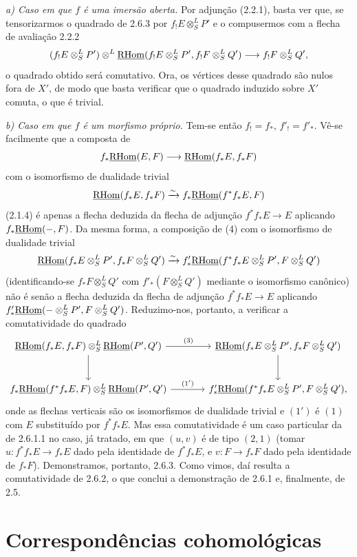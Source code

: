 \emph{a) Caso em que $f$ é uma imersão aberta.} Por adjunção (2.2.1), basta ver que, se tensorizarmos o quadrado de 2.6.3 por $f_!E\otimes^L_SP'$ e o compusermos com a flecha de avaliação 2.2.2
\[
(f_!E\otimes^L_SP')\otimes^L\underline{\mathrm{RHom}}(f_!E\otimes^L_SP',f_!F\otimes^L_SQ')\longrightarrow f_!F\otimes^L_SQ',
\]
o quadrado obtido será comutativo. Ora, os vértices desse quadrado são nulos fora de $X'$, de modo que basta verificar que o quadrado induzido sobre $X'$ comuta, o que é trivial.

\emph{b) Caso em que $f$ é um morfismo próprio.} Tem-se então $f_!=f_*$, $f'_!=f'_*$. Vê-se facilmente que a composta de
\[
f_*\underline{\mathrm{RHom}}(E,F)\longrightarrow\underline{\mathrm{RHom}}(f_*E,f_*F)
\]
com o isomorfismo de dualidade trivial
\[
\underline{\mathrm{RHom}}(f_*E,f_*F)\xrightarrow{\sim}f_*\underline{\mathrm{RHom}}(f^{*}f_*E,F)
\]
(2.1.4) é apenas a flecha deduzida da flecha de adjunção $f^{*}f_*E\to E$ aplicando $f_*\underline{\mathrm{RHom}}(-,F)$. Da mesma forma, a composição de (4) com o isomorfismo de dualidade trivial
\[
\underline{\mathrm{RHom}}(f_*E\otimes^L_SP',f_*F\otimes^L_SQ')\xrightarrow{\sim}f'_*\underline{\mathrm{RHom}}(f^{*}f_*E\otimes^L_SP',F\otimes^L_SQ')
\]
(identificando-se $f_*F\otimes^L_SQ'$ com $f'_*(F\otimes^L_SQ')$ mediante o isomorfismo canônico) não é senão a flecha deduzida da flecha de adjunção $f^{*}f_*E\to E$ aplicando $f'_*\underline{\mathrm{RHom}}(-\otimes^L_SP',F\otimes^L_SQ')$. Reduzimo-nos, portanto, a verificar a comutatividade do quadrado
\[
\begin{tikzcd}[column sep=large,row sep=large]
\uRHom(f_*E,f_*F)\otimes^L_S\uRHom(P',Q') \arrow[r,"(3)"] \arrow[d] & \uRHom(f_*E\otimes^L_SP',f_*F\otimes^L_SQ') \arrow[d]\\
f_*\uRHom(f^{*}f_*E,F)\otimes^L_S\uRHom(P',Q') \arrow[r,"(1')"] & f'_*\uRHom(f^{*}f_*E\otimes^L_SP',F\otimes^L_SQ'),
\end{tikzcd}
\]
onde as flechas verticais são os isomorfismos de dualidade trivial e $(1')$ é $(1)$ com $E$ substituído por $f^{*}f_*E$. Mas essa comutatividade é um caso particular da de 2.6.1.1 no caso, já tratado, em que $(u,v)$ é de tipo $(2,1)$ (tomar $u:f^{*}f_*E\to f_*E$ dado pela identidade de $f^{*}f_*E$, e $v:F\to f_*F$ dado pela identidade de $f_*F$). Demonstramos, portanto, 2.6.3. Como vimos, daí resulta a comutatividade de 2.6.2, o que conclui a demonstração de 2.6.1 e, finalmente, de 2.5.

\clearpage
\section{Correspondências cohomológicas}
